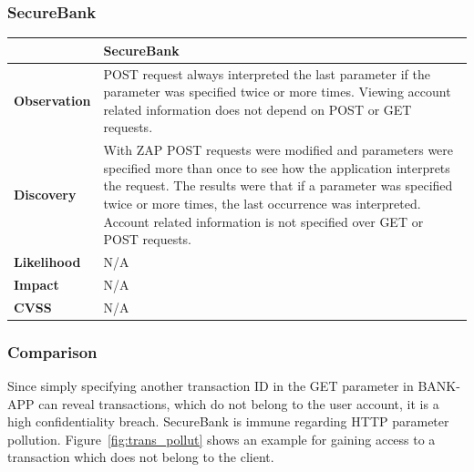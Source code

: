 \subsubsection{SecureBank}
\begin{tabular*}{\textwidth}{ p{} | p{} }\hline
    & \textbf{SecureBank} \\ \hline
    \textbf{Observation} & POST request always interpreted the last parameter if the parameter was specified twice or more times. Viewing account related information does not depend on POST or GET requests. \\
    \textbf{Discovery} & With ZAP POST requests were modified and parameters were specified more than once to see how the application interprets the request. The results were that if a parameter was specified twice or more times, the last occurrence was interpreted. Account related information is not specified over GET or POST requests. \\
    \textbf{Likelihood} & N/A \\
    \textbf{Impact} & N/A \\
    \textbf{CVSS} & N/A \\ \hline
\end{tabular*}

\subsubsection{Comparison}
Since simply specifying another transaction ID in the GET parameter in BANK-APP can reveal transactions, which do not belong to the user account, it is a high confidentiality breach. SecureBank is immune regarding HTTP parameter pollution. Figure~\ref{fig:trans_pollut} shows an example for gaining access to a transaction which does not belong to the client.


